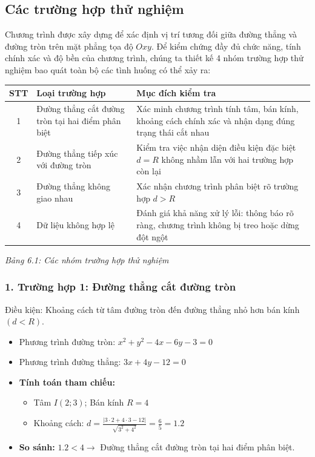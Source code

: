 \documentclass[12pt,a4paper]{article}
\begin{document}
\subsection{Các trường hợp thử nghiệm}
Chương trình được xây dựng để xác định vị trí tương đối giữa đường thẳng và đường tròn trên mặt phẳng tọa độ $Oxy$. Để kiểm chứng đầy đủ chức năng, tính chính xác và độ bền của chương trình, chúng ta thiết kế 4 nhóm trường hợp thử nghiệm bao quát toàn bộ các tình huống có thể xảy ra:

\vspace{0.3cm}
\begin{center}
    \begin{tabularx}{\textwidth}{|c|>{\raggedright\arraybackslash}p{5.5cm}|>{\raggedright\arraybackslash}X|}
    \hline
    \textbf{STT} & \textbf{Loại trường hợp} & \textbf{Mục đích kiểm tra} \\
    \hline
    1 & Đường thẳng cắt đường tròn tại hai điểm phân biệt & Xác minh chương trình tính tâm, bán kính, khoảng cách chính xác và nhận dạng đúng trạng thái cắt nhau \\
    \hline
    2 & Đường thẳng tiếp xúc với đường tròn & Kiểm tra việc nhận diện điều kiện đặc biệt $d=R$ không nhầm lẫn với hai trường hợp còn lại \\
    \hline
    3 & Đường thẳng không giao nhau & Xác nhận chương trình phân biệt rõ trường hợp $d>R$ \\
    \hline
    4 & Dữ liệu không hợp lệ & Đánh giá khả năng xử lý lỗi: thông báo rõ ràng, chương trình không bị treo hoặc dừng đột ngột \\
    \hline
    \end{tabularx}
    \vspace{0.2cm}
    
    \textit{Bảng 6.1: Các nhóm trường hợp thử nghiệm}
\end{center}
\vspace{0.3cm}

\subsubsection*{1. Trường hợp 1: Đường thẳng cắt đường tròn}
Điều kiện: Khoảng cách từ tâm đường tròn đến đường thẳng nhỏ hơn bán kính $(d < R)$.
\begin{itemize}
    \item Phương trình đường tròn: $x^{2}+y^{2}-4x-6y-3=0$
    \item Phương trình đường thẳng: $3x+4y-12=0$
    \item \textbf{Tính toán tham chiếu:}
    \begin{itemize}
        \item Tâm $I(2;3)$; Bán kính $R=4$
        \item Khoảng cách: $d = \frac{|3\cdot2 + 4\cdot3 - 12|}{\sqrt{3^{2} + 4^{2}}} = \frac{6}{5} = 1.2$
    \end{itemize}
    \item \textbf{So sánh:} $1.2 < 4 \rightarrow$ Đường thẳng cắt đường tròn tại hai điểm phân biệt.
\end{itemize}
\end{document}
